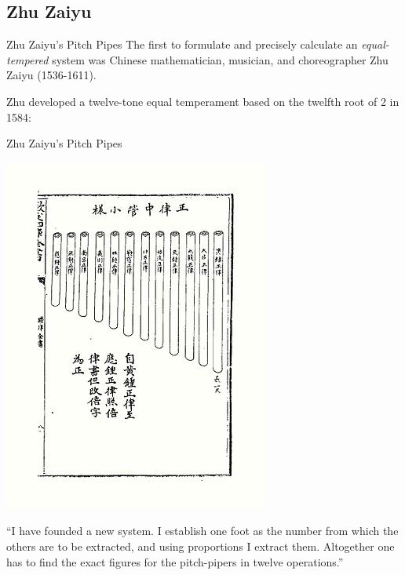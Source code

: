 \documentclass{beamer}
\begin{document}
\subsection{Zhu Zaiyu}
\begin{frame}{Zhu Zaiyu's Pitch Pipes}
    \pause The first to formulate and precisely calculate an \textit{equal-tempered} system was Chinese mathematician, musician, and choreographer Zhu Zaiyu (1536-1611).
    
    \pause Zhu developed a twelve-tone equal temperament based on the twelfth root of 2 in 1584:
\end{frame}

\begin{frame}{Zhu Zaiyu's Pitch Pipes}
    \begin{minipage}{.49\textwidth}
        \includegraphics[width=\textwidth]{zhu-zaiyu-pipes.jpg}
    \end{minipage}
    \begin{minipage}{.49\textwidth}
        ``I have founded a new system. I establish one foot as the number from which the others are to be extracted, and using proportions I extract them. Altogether one has to find the exact figures for the pitch-pipers in twelve operations.''
    \end{minipage}
\end{frame}
\end{document}
